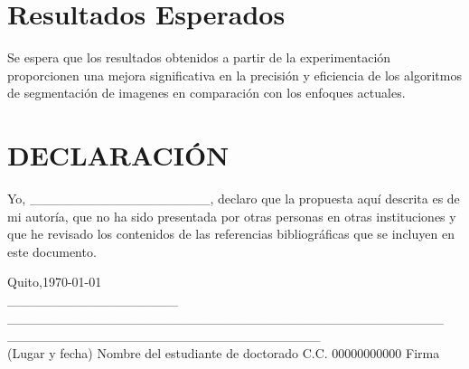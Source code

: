 \documentclass[a4paper,12pt]{article}
\begin{document}
\newpage

\section{Resultados Esperados}
Se espera que los resultados obtenidos a partir de la experimentación proporcionen una mejora significativa en la precisión y eficiencia de los algoritmos de segmentación de imagenes en comparación con los enfoques actuales.\cite{referencia2}

\newpage

\section*{}

%			
%			

\newpage

\section*{DECLARACIÓN}

Yo, \_\_\_\_\_\_\_\_\_\_\_\_\_\_\_\_\_\_\_, declaro que la propuesta aquí descrita es de mi autoría, que no ha sido presentada por otras personas en otras instituciones y que he revisado los contenidos de las referencias bibliográficas que se incluyen en este documento.

\vspace{1cm}

\begin{flushleft}
	Quito,\today\\
	\_\_\_\_\_\_\_\_\_\_\_\_\_\_\_\_\_\_\hspace{0.1cm} \_\_\_\_\_\_\_\_\_\_\_\_\_\_\_\_\_\_\_\_\_\_\_\_\_\_\_\_\_\_\_\_\_\_\_\_\_\_\_\_\_\_\_\_\_\_  \hspace{0.3cm}\_\_\_\_\_\_\_\_\_\_\_\_\_\_\_\_\_\hspace{0.1cm}\_\_\_\_\_\_\_\_\_\_\_\_\_\_\_\_\\
	(Lugar y fecha) \hspace{0.2cm} Nombre del estudiante de doctorado \hspace{0.2cm} C.C.\hspace{0.05cm} 00000000000 \hspace{0.1cm} Firma \\
\end{flushleft}
\end{document}
